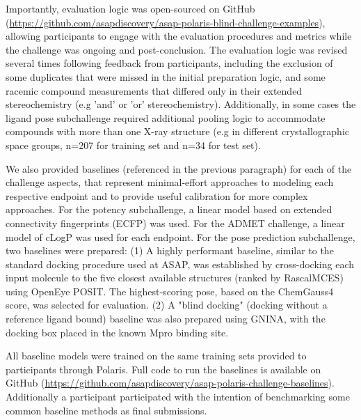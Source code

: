 \documentclass[journal=jcim,manuscript=article]{achemso}
\begin{document}
Importantly, evaluation logic was open-sourced on GitHub (\url{https://github.com/asapdiscovery/asap-polaris-blind-challenge-examples}), allowing participants to engage with the evaluation procedures and metrics while the challenge was ongoing and post-conclusion. The evaluation logic was revised several times following feedback from participants, including the exclusion of some duplicates that were missed in the initial preparation logic, and some racemic compound measurements that differed only in their extended stereochemistry (e.g 'and' or 'or' stereochemistry). Additionally, in some cases the ligand pose subchallenge required additional pooling logic to accommodate compounds with more than one X-ray structure (e.g in different crystallographic space groups, n=207 for training set and n=34 for test set). 

We also provided baselines (referenced in the previous paragraph) for each of the challenge aspects, that represent minimal-effort approaches to modeling each respective endpoint and to provide useful calibration for more complex approaches. For the potency subchallenge, a linear model based on extended connectivity fingerprints (ECFP)\cite{ecfp_2010} was used. For the ADMET challenge, a linear model of cLogP\cite{clogp_1999} was used for each endpoint. For the pose prediction subchallenge, two baselines were prepared: (1) A highly performant baseline, similar to the standard docking procedure used at ASAP, was established by cross-docking each input molecule to the five closest available structures (ranked by RascalMCES\cite{raymond_rascal_2002, rdkit}) using OpenEye POSIT\cite{kelley_posit_2015}. The highest-scoring pose, based on the ChemGauss4\cite{oetk} score, was selected for evaluation. (2) A "blind docking" (docking without a reference ligand bound) baseline was also prepared using GNINA\cite{mcnutt_gnina_2025}, with the docking box placed in the known Mpro binding site. 

All baseline models were trained on the same training sets provided to participants through Polaris. Full code to run the baselines is available on GitHub (\url{https://github.com/asapdiscovery/asap-polaris-challenge-baselines}). Additionally a participant participated with the intention of benchmarking some common baseline methods as final submissions\cite{beauty_baseline_2025}. 

\end{document}
